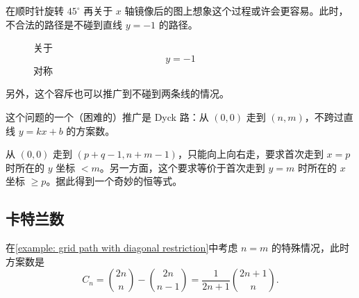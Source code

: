     \begin{remark}
        在顺时针旋转 $45^\circ$ 再关于 $x$ 轴镜像后的图上想象这个过程或许会更容易。此时，不合法的路径是不碰到直线 $y=-1$ 的路径。

    
    \begin{figure}[htbp]
        \centering
    \caption{关于 $$y=-1$$ 对称}
    \end{figure}

    另外，这个容斥也可以推广到不碰到两条线的情况。
    \end{remark}
    \begin{remark}
        这个问题的一个（困难的）推广是 Dyck 路：从 $(0,0)$ 走到 $(n,m)$，不跨过直线 $y=kx+b$ 的方案数。
    \end{remark}
    
    \begin{exercise}
        从 $(0,0)$ 走到 $(p+q-1,n+m-1)$，只能向上向右走，要求首次走到 $x=p$ 时所在的 $y$ 坐标 $<m$。另一方面，这个要求等价于首次走到 $y=m$ 时所在的 $x$ 坐标 $\ge p$。据此得到一个奇妙的恒等式。
    \end{exercise}
    
\subsection{卡特兰数}

    在\cref{example: grid path with diagonal restriction}中考虑 $n=m$ 的特殊情况，此时方案数是 
    $$
    C_n=\binom{2n}{n}-\binom{2n}{n-1}=\frac{1}{2n+1}\binom{2n+1}{n}.
    $$
    
